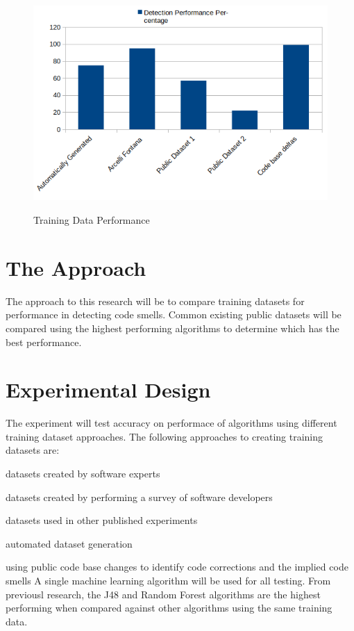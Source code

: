 \documentclass[conference]{IEEEtran}
\begin{document}
\begin{figure}[ht]{
  \includegraphics[width=\columnwidth]{teaser.png}}
  \caption{Training Data Performance}
  \label{fig:ts}
\end{figure} 

\section{The Approach}
The approach to this research will be to compare training datasets for performance in detecting code smells.
Common existing public datasets will be compared using the highest performing algorithms to determine which has the best performance.

\section{Experimental Design}
The experiment will test accuracy on performace of algorithms using different training dataset approaches.
The following approaches to creating training datasets are: 
\enumerate
\item datasets created by software experts
\item datasets created by performing a survey of software developers 
\item datasets used in other published experiments
\item automated dataset generation
\item using public code base changes to identify code corrections and the implied code smells
\endenumerate
A single machine learning algorithm will be used for all testing. 
From previousl research\cite{arcelli_fontana_comparing_2016}, the J48 and Random Forest algorithms are the highest performing when compared against other algorithms using the same training data.
\end{document}
